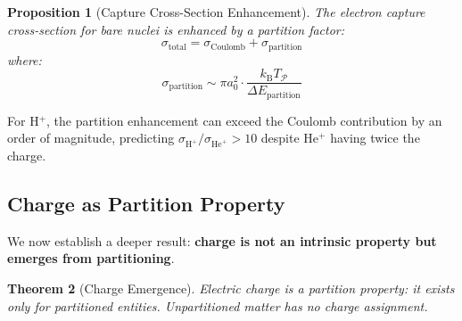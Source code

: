 \documentclass[twocolumn,10pt,a4paper]{article}
\newtheorem{theorem}{Theorem}[section]
\newtheorem{proposition}[theorem]{Proposition}
\theoremstyle{definition}
\theoremstyle{remark}
\newcommand{\kB}{k_{\mathrm{B}}}
\newcommand{\Partition}{\mathcal{P}}
\begin{document}
\begin{proposition}[Capture Cross-Section Enhancement]
\label{prop:capture_enhancement}
The electron capture cross-section for bare nuclei is enhanced by a partition factor:
\begin{equation}
    \sigma_{\text{total}} = \sigma_{\text{Coulomb}} + \sigma_{\text{partition}}
\end{equation}
where:
\begin{equation}
    \sigma_{\text{partition}} \sim \pi a_0^2 \cdot \frac{\kB T_{\Partition}}{\Delta E_{\text{partition}}}
\end{equation}
\end{proposition}

For H$^+$, the partition enhancement can exceed the Coulomb contribution by an order of magnitude, predicting $\sigma_{\text{H}^+}/\sigma_{\text{He}^+} > 10$ despite He$^+$ having twice the charge.

\subsection{Charge as Partition Property}

We now establish a deeper result: \textbf{charge is not an intrinsic property but emerges from partitioning}.

\begin{theorem}[Charge Emergence]
\label{thm:charge_emergence}
Electric charge is a partition property: it exists only for partitioned entities. Unpartitioned matter has no charge assignment.
\end{theorem}
\end{document}
